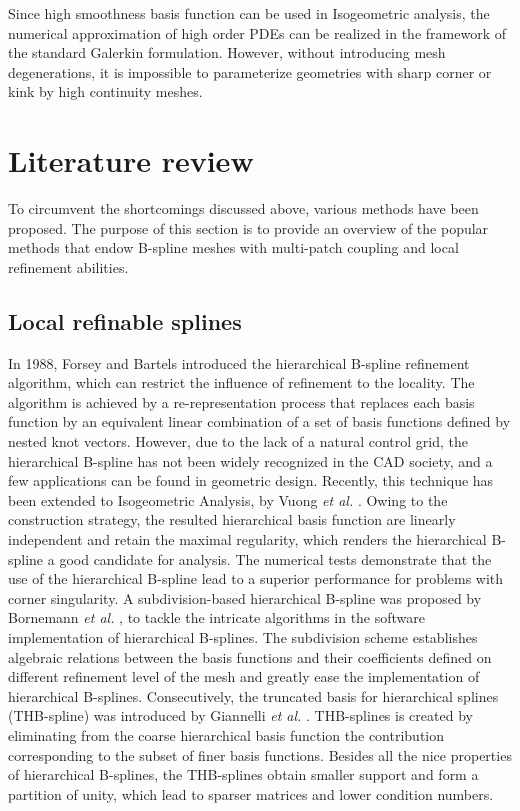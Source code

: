 \documentclass[preprint,12pt]{elsarticle}
\theoremstyle{remark}
\begin{document}
Since high smoothness basis function can be used in Isogeometric analysis, the numerical approximation of high order PDEs can be realized in the framework of the standard Galerkin formulation. However, without introducing mesh degenerations, it is impossible to parameterize geometries with sharp corner or kink by high continuity meshes.

\section{Literature review}
To circumvent the shortcomings discussed above, various methods have been proposed. The purpose of this section is to provide an overview of the popular methods that endow B-spline meshes with multi-patch coupling and local refinement abilities. 
\subsection{Local refinable splines}
In 1988, Forsey and Bartels \cite{forsey_hierarchical_1988} introduced the hierarchical B-spline refinement algorithm, which can restrict the influence of refinement to the locality. The algorithm is achieved by a re-representation process that replaces each basis function by an equivalent linear combination of a set of basis functions defined by nested knot vectors. However, due to the lack of a natural control grid, the hierarchical B-spline has not been widely recognized in the CAD society, and a few applications can be found in geometric design. Recently, this technique has been extended to Isogeometric Analysis, by Vuong \textit{et al.} \cite{vuong_hierarchical_2011}. Owing to the construction strategy, the resulted hierarchical basis function are linearly independent and retain the maximal regularity, which renders the hierarchical B-spline a good candidate for analysis. The numerical tests demonstrate that the use of the hierarchical B-spline lead to a superior performance for problems with corner singularity. A subdivision-based hierarchical B-spline was proposed by Bornemann \textit{et al.} \cite{bornemann_subdivision-based_2013}, to tackle the intricate algorithms in the software implementation of hierarchical B-splines. The subdivision scheme establishes algebraic relations between the basis functions and their coefficients defined on different refinement level of the mesh and greatly ease the implementation of hierarchical B-splines. Consecutively, the truncated basis for hierarchical splines (THB-spline) was introduced by Giannelli \textit{et al.} \cite{giannelli_thb-splines:_2012}. THB-splines is created by eliminating from the coarse hierarchical basis function the contribution corresponding to the subset of finer basis functions. Besides all the nice properties of hierarchical B-splines, the THB-splines obtain smaller support and form a partition of unity, which lead to sparser matrices and lower condition numbers. \par
\end{document}
